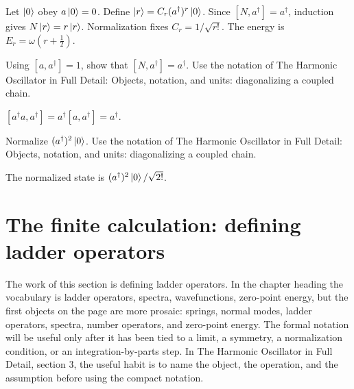 \begin{example}
Let \(\left|0\right\rangle\) obey \(a\left|0\right\rangle=0\).  Define \(\left|r\right\rangle=C_r(a^\dagger)^r\left|0\right\rangle\).  Since \([N,a^\dagger]=a^\dagger\), induction gives \(N\left|r\right\rangle=r\left|r\right\rangle\).  Normalization fixes \(C_r=1/\sqrt{r!}\).  The energy is \(E_r=\omega(r+\frac12)\).
\end{example}



\begin{exercise}
Using \([a,a^\dagger]=1\), show that \([N,a^\dagger]=a^\dagger\).  Use the notation of The Harmonic Oscillator in Full Detail: Objects, notation, and units: diagonalizing a coupled chain.
\begin{answer}
\([a^\dagger a,a^\dagger]=a^\dagger[a,a^\dagger]=a^\dagger\).
\end{answer}
\end{exercise}

\begin{exercise}
Normalize \((a^\dagger)^2\left|0\right\rangle\).  Use the notation of The Harmonic Oscillator in Full Detail: Objects, notation, and units: diagonalizing a coupled chain.
\begin{answer}
The normalized state is \((a^\dagger)^2\left|0\right\rangle/\sqrt{2!}\).
\end{answer}
\end{exercise}



\section{The finite calculation: defining ladder operators}













The work of this section is defining ladder operators.  In the chapter heading the vocabulary is ladder operators, spectra, wavefunctions, zero-point energy, but the first objects on the page are more prosaic: springs, normal modes, ladder operators, spectra, number operators, and zero-point energy.  The formal notation will be useful only after it has been tied to a limit, a symmetry, a normalization condition, or an integration-by-parts step.  In The Harmonic Oscillator in Full Detail, section 3, the useful habit is to name the object, the operation, and the assumption before using the compact notation.

